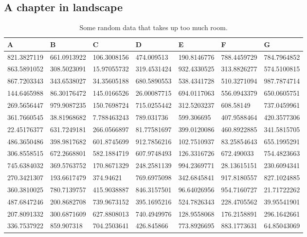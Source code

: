 \documentclass[lscape]{msu-thesis}
\begin{document}
\begin{landscape}
\chapter{A chapter in landscape}

\begin{table}[htbp]
\centering
\begin{tabular}{lllllll}

\toprule
A & B & C & D & E & F & G \\
\midrule
821.3827119 & 661.0913922 & 106.3008156 & 474.009513 & 190.8146776 & 788.4459729 & 784.7964852 \\
863.5891052 & 308.5023091 & 15.97055732 & 319.4531424 & 932.4330525 & 313.8826277 & 574.5100815 \\
867.7203343 & 343.6538027 & 34.35605188 & 680.5890553 & 538.4341728 & 510.3271094 & 987.7874714 \\
144.6465988 & 86.30176472 & 145.0166526 & 26.00087715 & 694.0117063 & 556.0943379 & 650.0605751 \\
269.5656447 & 979.9087235 & 150.7698724 & 715.0255442 & 312.5203237 & 608.58149 & 737.0459961 \\
361.7660545 & 38.81968682 & 7.788463243 & 789.031736 & 599.306695 & 407.9588464 & 420.3577306 \\
22.45176377 & 631.7249181 & 266.0566897 & 81.77581697 & 399.0120086 & 460.8922885 & 341.5815705 \\
486.3650486 & 398.9817682 & 601.8745699 & 912.7856216 & 102.7510937 & 83.25854643 & 655.1995291 \\
306.8558515 & 672.2668801 & 582.1884719 & 607.9748493 & 126.3316726 & 672.490033 & 754.4823663 \\
745.6384032 & 369.5763752 & 170.8671329 & 248.2581139 & 994.2369771 & 28.13615151 & 230.6094341 \\
270.3421307 & 193.6617479 & 374.94621 & 769.6975098 & 342.6845841 & 917.8180557 & 827.1024885 \\
360.3810025 & 780.7139757 & 415.9038887 & 846.3157501 & 96.64026956 & 954.7160727 & 21.71722262 \\
487.6847246 & 200.8682708 & 739.9673152 & 395.1695216 & 524.7826343 & 228.4705562 & 39.95541901 \\
207.8091332 & 300.6871609 & 627.8808013 & 740.4949976 & 128.9558068 & 176.2158891 & 296.1642661 \\
336.7537922 & 859.907318 & 704.2503641 & 426.845866 & 773.8926695 & 883.1773631 & 64.85043069 \\

\bottomrule
\end{tabular}

\caption{Some random data that takes up too much room.}
\end{table}
\end{landscape}
\end{document}
